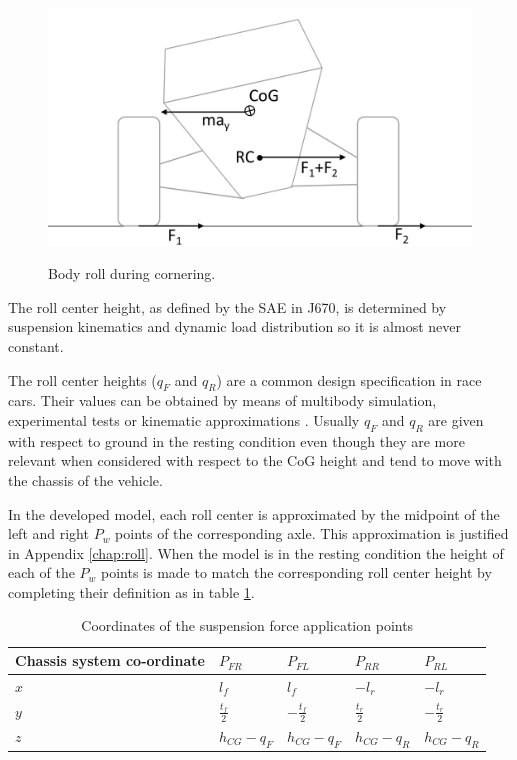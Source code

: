 \begin{figure}[ht]
  \centering
  \includegraphics[height = 7cm]{images/roll}
  \caption{Body roll during cornering.}
  \label{roll}
\end{figure}

The roll center height, as defined by the SAE in J670, is determined by suspension kinematics and dynamic load distribution so it is almost never constant.

The roll center heights ($q_F$ and $q_R$) are a common design specification in race cars.
Their values can be obtained by means of multibody simulation, experimental tests or kinematic approximations \cite{gillespie}.
Usually $q_F$ and $q_R$ are given with respect to ground in the resting condition even though they are more relevant when considered with respect to the CoG height and tend to move with the chassis of the vehicle.

In the developed model, each roll center is approximated by the midpoint of the left and right $P_w$ points of the corresponding axle. This approximation is justified in Appendix \ref{chap:roll}.
When the model is in the resting condition the height of each of the $P_w$ points is made to match the corresponding roll center height by completing their definition as in table \ref{table:susppoints}.

\begin{table}[ht]
  \caption{Coordinates of the suspension force application points} %
  \centering %
  \begin{tabular}{l l l l l} %
    \hline\hline %
    Chassis system co-ordinate & $P_{FR}$ & $P_{FL}$ & $P_{RR}$ & $P_{RL}$ \\ [0.5ex] %
    \hline %
    $ x$ & $ l_f$ & $ l_f$ & $-l_r $ & $-l_r $\\ %
    $ y$ & $ \frac{t_f}{2} $ & $ -\frac{t_f}{2}$ & $ \frac{t_r}{2}$ & $ -\frac{t_r}{2}$\\ %
    $ z$ & $ h_{CG} - q_F $& $ h_{CG} - q_F $ & $ h_{CG} - q_R$ & $ h_{CG} - q_R$ \\ [1ex] %
    \hline %
  \end{tabular}
  \label{table:susppoints} %
\end{table}

